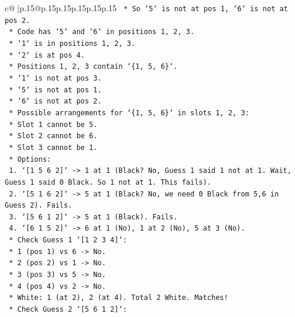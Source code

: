 \documentclass{article}
\begin{document}
{\begin{supertabular}{c@{$\;$}|p{.15\linewidth}@{}p{.15\linewidth}p{.15\linewidth}p{.15\linewidth}p{.15\linewidth}p{.15\linewidth}}
{{{\texttt{            *   So `5` is not at pos 1, `6` is not at pos 2.} \\
\texttt{            *   Code has `5` and `6` in positions 1, 2, 3.} \\
\texttt{            *   `1` is in positions 1, 2, 3.} \\
\texttt{            *   `2` is at pos 4.} \\
\texttt{            *   Positions 1, 2, 3 contain `\{1, 5, 6\}`.} \\
\texttt{            *   `1` is not at pos 3.} \\
\texttt{            *   `5` is not at pos 1.} \\
\texttt{            *   `6` is not at pos 2.} \\
\texttt{            *   Possible arrangements for `\{1, 5, 6\}` in slots 1, 2, 3:} \\
\texttt{                *   Slot 1 cannot be 5.} \\
\texttt{                *   Slot 2 cannot be 6.} \\
\texttt{                *   Slot 3 cannot be 1.} \\
\texttt{                *   Options:} \\
\texttt{                    1. `{[}1 5 6 2{]}` {-}> 1 at 1 (Black? No, Guess 1 said 1 not at 1. Wait, Guess 1 said 0 Black. So 1 not at 1. This fails).} \\
\texttt{                    2. `{[}5 1 6 2{]}` {-}> 5 at 1 (Black? No, we need 0 Black from 5,6 in Guess 2). Fails.} \\
\texttt{                    3. `{[}5 6 1 2{]}` {-}> 5 at 1 (Black). Fails.} \\
\texttt{                    4. `{[}6 1 5 2{]}` {-}> 6 at 1 (No), 1 at 2 (No), 5 at 3 (No).} \\
\texttt{                        *   Check Guess 1 `{[}1 2 3 4{]}`:} \\
\texttt{                            *   1 (pos 1) vs 6 {-}> No.} \\
\texttt{                            *   2 (pos 2) vs 1 {-}> No.} \\
\texttt{                            *   3 (pos 3) vs 5 {-}> No.} \\
\texttt{                            *   4 (pos 4) vs 2 {-}> No.} \\
\texttt{                            *   White: 1 (at 2), 2 (at 4). Total 2 White. Matches!} \\
\texttt{                        *   Check Guess 2 `{[}5 6 1 2{]}`:} \\
}}}
\end{supertabular}}
\end{document}
